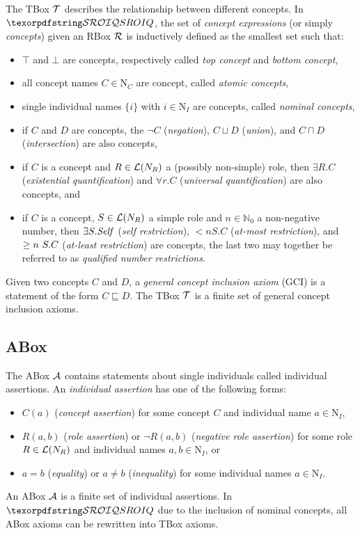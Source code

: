 The TBox $\mathcal{T}$ describes the relationship between different concepts. In $\SROIQ$, the set of \emph{concept expressions} (or simply \emph{concepts}) given an RBox $\mathcal{R}$ is inductively defined as the smallest set such that:
\begin{itemize}
    \item $\top$ and $\bot$ are concepts, respectively called \emph{top concept} and \emph{bottom concept},
    \item all concept names $C \in \mathrm{N}_C$ are concept, called \emph{atomic concepts},
    \item single individual names $\{ i \}$ with $i \in \mathrm{N}_I$ are concepts, called \emph{nominal concepts},
    \item if $C$ and $D$ are concepts, the $\lnot C$ (\emph{negation}), $C \sqcup D$ (\emph{union}), and $C \sqcap D$ (\emph{intersection}) are also concepts,
    \item if $C$ is a concept and $R \in \mathcal{L}(N_R)$ a (possibly non-simple) role, then $\exists R.C$ (\emph{existential quantification}) and $\forall r.C$ (\emph{universal quantification}) are also concepts, and
    \item if $C$ is a concept, $S \in \mathcal{L}(N_R)$ a simple role and $n \in \mathbb{N}_0$ a non-negative number, then $\exists S.\mathit{Self}$ (\emph{self restriction}), $\less n S.C$ (\emph{at-most restriction}), and $\geq n~S.C$ (\emph{at-least restriction}) are concepts, the last two may together be referred to as \emph{qualified number restrictions}.
\end{itemize}
Given two concepts $C$ and $D$, a \emph{general concept inclusion axiom} (GCI) is a statement of the form $C \sqsubseteq D$. The TBox $\mathcal{T}$ is a finite set of general concept inclusion axioms.

\subsection{ABox} \label{abox}

The ABox $\mathcal{A}$ contains statements about single individuals called individual assertions. An \emph{individual assertion} has one of the following forms:
\begin{itemize}
    \item $C(a)$ (\emph{concept assertion}) for some concept $C$ and individual name $a \in \mathrm{N}_I$,
    \item $R(a, b)$ (\emph{role assertion}) or $\lnot R(a, b)$ (\emph{negative role assertion}) for some role $R \in \mathcal{L}(N_R)$ and individual names $a, b \in \mathrm{N}_I$, or
    \item $a = b$ (\emph{equality}) or $a \not = b$ (\emph{inequality}) for some individual names $a \in \mathrm{N}_I$.
\end{itemize}
An ABox $\mathcal{A}$ is a finite set of individual assertions. In $\SROIQ$ due to the inclusion of nominal concepts, all ABox axioms can be rewritten into TBox axioms.
